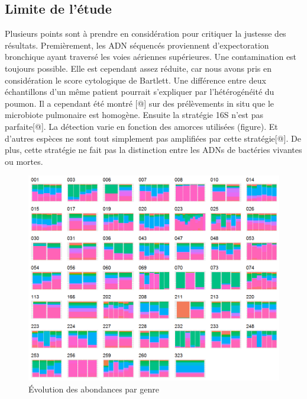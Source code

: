 \documentclass[12pt,a4paper]{article}
\begin{document}
\subsection{Limite de l'étude}
Plusieurs points sont à prendre en considération pour critiquer la justesse des résultats. Premièrement, les ADN séquencés proviennent d'expectoration bronchique ayant traversé les voies aériennes supérieures. Une contamination est toujours possible. Elle est cependant assez réduite, car nous avons pris en considération le score cytologique de Bartlett.
Une différence entre deux échantillons d'un même patient pourrait s'expliquer par l'hétérogénéité du poumon. Il a cependant été montré [@] sur des prélèvements in situ que le microbiote pulmonaire est homogène.
Ensuite la stratégie 16S n'est pas parfaite[@]. La détection varie en fonction des amorces utilisées (figure). Et d'autres espèces ne sont tout simplement pas amplifiées par cette stratégie[@]. De plus, cette stratégie ne fait pas la distinction entre les ADNs de bactéries vivantes ou mortes.
\begin{figure}
\begin{center}
\includegraphics[scale=0.70]{img/enfin_barplot_genus_norm.png}\hfill
\end{center}
\caption{Évolution des abondances par genre}
\label{plotabundancegenre}
\end{figure}
\end{document}
